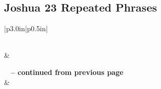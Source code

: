 \subsection{Joshua 23 Repeated Phrases}


\normalsize
 
\begin{center}
\begin{longtable}{|p{3.0in}|p{0.5in}|}
\caption[Joshua 23 Repeated Phrases]{Joshua 23 Repeated Phrases}\label{table:Repeated Phrases Joshua 23} \\
\hline {} &  \\ \hline 
\endfirsthead
 
{{\bfseries \tablename\ \thetable{} -- continued from previous page}} \\  
\hline {} &  \\ \hline 
\endhead
 

\end{longtable}
\end{center}
